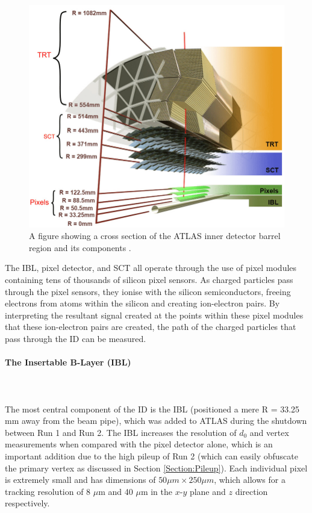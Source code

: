 \documentclass[12pt,a4paper,epsf,portrait,times,epsfig]{article}
\begin{document}
		\begin{figure}
			\centering
			\includegraphics[scale=0.4]{ATLAS_ID_Layers}
			\caption{A figure showing a cross section of the ATLAS inner detector barrel region and its components \cite{ATLASIDImage}.}
			\label{Fig:InnerDetectorXsec}
		\end{figure}

		The IBL, pixel detector, and SCT all operate through the use of pixel modules containing tens of thousands of silicon pixel sensors. As charged particles pass through the pixel sensors, they ionise with the silicon semiconductors, freeing electrons from atoms within the silicon and creating ion-electron pairs. By interpreting the resultant signal created at the points within these pixel modules that these ion-electron pairs are created, the path of the charged particles that pass through the ID can be measured. 

		\paragraph{The Insertable B-Layer (IBL)}\label{Section:IBL}
		\mbox{}\\
		\mbox{} \\

		The most central component of the ID is the IBL \cite{IBL-TDR} (positioned a mere R = 33.25 mm away from the beam pipe), which was added to ATLAS during the shutdown between Run 1 and Run 2. The IBL increases the resolution of $d_{0}$ and vertex measurements when compared with the pixel detector alone, which is an important addition due to the high pileup of Run 2 (which can easily obfuscate the primary vertex as discussed in Section \ref{Section:Pileup}). Each individual pixel is extremely small and has dimensions of $50 \mu m \times 250 \mu m$, which allows for a tracking resolution of 8 $\mu$m and 40 $\mu$m in the $x$-$y$ plane and $z$ direction respectively.  
\end{document}
